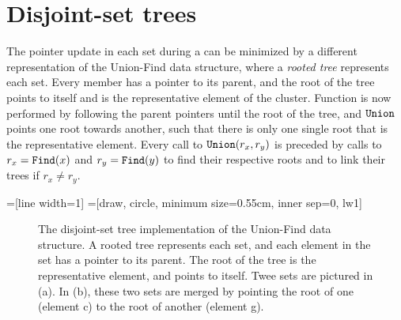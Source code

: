 \section{Disjoint-set trees}
The pointer update in each set during a  can be minimized by a different representation of the Union-Find data structure, where a \emph{rooted tree} represents each set. Every member has a pointer to its parent, and the root of the tree points to itself and is the representative element of the cluster. Function  is now performed by following the parent pointers until the root of the tree, and $\texttt{Union}$ points one root towards another, such that there is only one single root that is the representative element. Every call to $\texttt{Union}(r_x,r_y)$ is preceded by calls to $r_x=\texttt{Find}(x)$ and $r_y=\texttt{Find}(y)$ to find their respective roots and to link their trees if $r_x \neq r_y$. 

=[line width=1]
=[draw, circle, minimum size=0.55cm, inner sep=0, lw1]

\begin{figure}[htpb]
  \centering
  \caption{The disjoint-set tree implementation of the Union-Find data structure. A rooted tree represents each set, and each element in the set has a pointer to its parent. The root of the tree is the representative element, and points to itself. Twee sets are pictured in (a). In (b), these two sets are merged by pointing the root of one (element c) to the root of another (element g).}
  \label{fig:parentpointers}
\end{figure}

